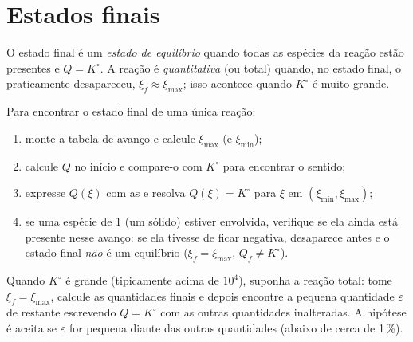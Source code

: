 \section{Estados finais}

\begin{definition}\label{def:b1:extent-q-and-k:quantitative}
O estado final é um \emph{estado de equilíbrio}
quando todas as espécies da reação estão presentes e $Q = K^\circ$. A
reação é \emph{quantitativa} (ou total)
quando, no estado final, o  praticamente desapareceu,
$\xi_f \approx \xi_{\max}$; isso acontece quando $K^\circ$ é muito
grande.
\end{definition}

\begin{method}\label{met:b1:extent-q-and-k:final-state}
Para encontrar o estado final de uma única reação:
\begin{enumerate}
  \item monte a tabela de avanço e calcule $\xi_{\max}$ (e $\xi_{\min}$);
  \item calcule $Q$ no início e compare-o com $K^\circ$ para encontrar o
        sentido;
  \item expresse $Q(\xi)$ com as  e resolva $Q(\xi) = K^\circ$
        para $\xi$ em $(\xi_{\min}, \xi_{\max})$;
  \item se uma espécie de  1 (um sólido) estiver envolvida,
        verifique se ela ainda está presente nesse avanço: se ela tivesse
        de ficar negativa, desaparece antes e o estado final \emph{não} é
        um equilíbrio ($\xi_f = \xi_{\max}$, $Q_f \ne K^\circ$).
\end{enumerate}
\end{method}

\begin{method}\label{met:b1:extent-q-and-k:quantitative}
Quando $K^\circ$ é grande (tipicamente acima de $10^4$), suponha a
reação total: tome $\xi_f = \xi_{\max}$, calcule as quantidades finais e
depois encontre a pequena quantidade $\varepsilon$ de 
restante escrevendo $Q =
K^\circ$ com as outras quantidades inalteradas. A hipótese é aceita se
$\varepsilon$ for pequena diante das outras quantidades (abaixo de cerca
de 1\,\%).
\end{method}

